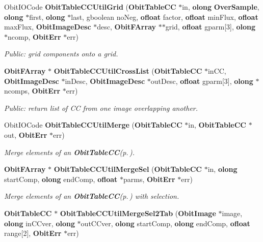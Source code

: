\begin{CompactItemize}
\item 
Obit\-IOCode {\bf Obit\-Table\-CCUtil\-Grid} ({\bf Obit\-Table\-CC} $\ast$in, {\bf olong} {\bf Over\-Sample}, {\bf olong} $\ast$first, {\bf olong} $\ast$last, gboolean no\-Neg, {\bf ofloat} factor, {\bf ofloat} min\-Flux, {\bf ofloat} max\-Flux, {\bf Obit\-Image\-Desc} $\ast$desc, {\bf Obit\-FArray} $\ast$$\ast$grid, {\bf ofloat} gparm[3], {\bf olong} $\ast$ncomp, {\bf Obit\-Err} $\ast$err)
\begin{CompactList}\small\item\em Public: grid components onto a grid. \item\end{CompactList}\item 
{\bf Obit\-FArray} $\ast$ {\bf Obit\-Table\-CCUtil\-Cross\-List} ({\bf Obit\-Table\-CC} $\ast$in\-CC, {\bf Obit\-Image\-Desc} $\ast$in\-Desc, {\bf Obit\-Image\-Desc} $\ast$out\-Desc, {\bf ofloat} gparm[3], {\bf olong} $\ast$ncomps, {\bf Obit\-Err} $\ast$err)
\begin{CompactList}\small\item\em Public: return list of CC from one image overlapping another. \item\end{CompactList}\item 
Obit\-IOCode {\bf Obit\-Table\-CCUtil\-Merge} ({\bf Obit\-Table\-CC} $\ast$in, {\bf Obit\-Table\-CC} $\ast$out, {\bf Obit\-Err} $\ast$err)
\begin{CompactList}\small\item\em Merge elements of an {\bf Obit\-Table\-CC}{\rm (p.\,\pageref{structObitTableCC})}. \item\end{CompactList}\item 
{\bf Obit\-FArray} $\ast$ {\bf Obit\-Table\-CCUtil\-Merge\-Sel} ({\bf Obit\-Table\-CC} $\ast$in, {\bf olong} start\-Comp, {\bf olong} end\-Comp, {\bf ofloat} $\ast$parms, {\bf Obit\-Err} $\ast$err)
\begin{CompactList}\small\item\em Merge elements of an {\bf Obit\-Table\-CC}{\rm (p.\,\pageref{structObitTableCC})} with selection. \item\end{CompactList}\item 
{\bf Obit\-Table\-CC} $\ast$ {\bf Obit\-Table\-CCUtil\-Merge\-Sel2Tab} ({\bf Obit\-Image} $\ast$image, {\bf olong} in\-CCver, {\bf olong} $\ast$out\-CCver, {\bf olong} start\-Comp, {\bf olong} end\-Comp, {\bf ofloat} range[2], {\bf Obit\-Err} $\ast$err)
$$
\end{CompactItemize}
